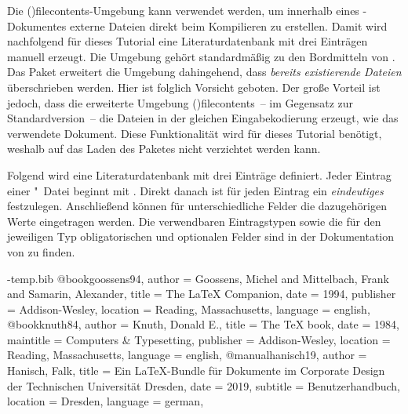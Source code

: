 \documentclass[%
  english,ngerman,%
  cdgeometry=no,DIV=12,%
  cd=false,cdfont=false,cdtitle=true,%
  headings=normal,%
  automark,%
  listof=toc,%
]{tudscrartcl}
\begin{document}
Die \Environment(){filecontents}-Umgebung kann verwendet 
werden, um innerhalb eines -Dokumentes externe Dateien direkt 
beim Kompilieren zu erstellen. Damit wird nachfolgend für dieses Tutorial eine 
Literaturdatenbank  mit drei Einträgen manuell erzeugt. 
Die Umgebung gehört standardmäßig zu den Bordmitteln von . Das 
Paket  erweitert die Umgebung dahingehend, dass 
\emph{bereits existierende Dateien} überschrieben werden. Hier ist folglich 
Vorsicht geboten. Der große Vorteil ist jedoch, dass die erweiterte Umgebung 
\Environment(){filecontents}~-- im Gegensatz zur 
Standardversion~-- die Dateien in der gleichen Eingabekodierung erzeugt, wie 
das verwendete Dokument. Diese Funktionalität wird für dieses Tutorial 
benötigt, weshalb auf das Laden des Paketes  nicht 
verzichtet werden kann. 
%
\begin{Preamble}
\usepackage{filecontents}
\end{Preamble}
%
Folgend wird eine Literaturdatenbank mit drei Einträge definiert. Jeder Eintrag 
einer "~Datei beginnt mit . Direkt 
danach ist für jeden Eintrag ein \emph{eindeutiges}  
festzulegen. Anschließend können für unterschiedliche Felder die dazugehörigen 
Werte eingetragen werden. Die verwendbaren Eintragstypen sowie die für den 
jeweiligen Typ obligatorischen und optionalen Felder sind in der Dokumentation 
von  zu finden.
%
\begin{Preamble}
\begin{filecontents}[nosearch]{\jobname-temp.bib}
@book{goossens94,
  author    = {Goossens, Michel and Mittelbach, Frank and 
                Samarin, Alexander},
  title     = {The \LaTeX{} Companion},
  date      = {1994},
  publisher = {Addison-Wesley},
  location  = {Reading, Massachusetts},
  language  = {english},
}
@book{knuth84,
  author    = {Knuth, Donald E.},
  title     = {The \TeX{} book},
  date      = {1984},
  maintitle = {Computers \& Typesetting},
  publisher = {Addison-Wesley},
  location  = {Reading, Massachusetts},
  language  = {english},
}
@manual{hanisch19,
  author    = {Hanisch, Falk},
  title     = {Ein \LaTeX-Bundle für Dokumente im Corporate Design der 
                Technischen Universität Dresden},
  date      = {2019},
  subtitle  = {Benutzerhandbuch},
  location  = {Dresden},
  language  = {german},
}
\end{filecontents}
\end{Preamble}
\end{document}

